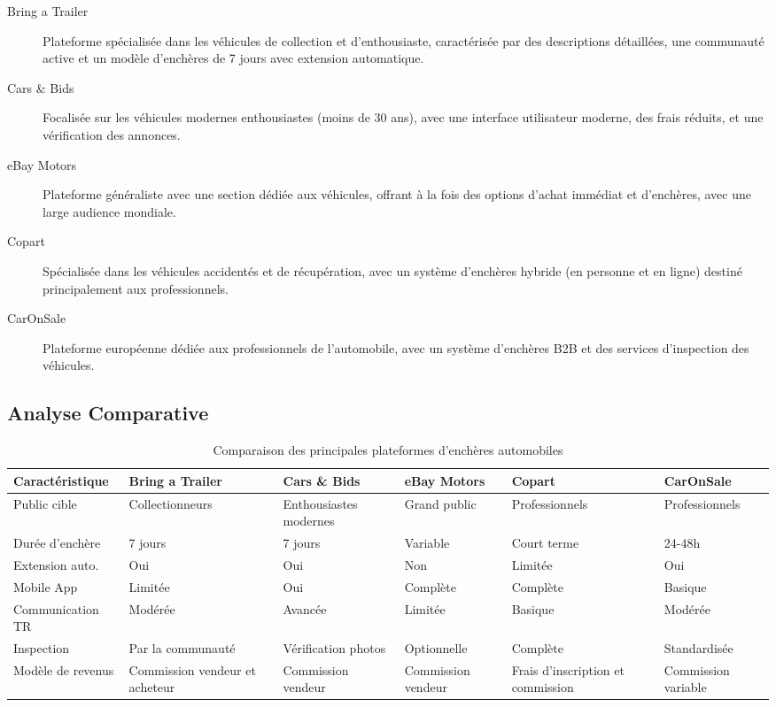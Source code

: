 \begin{description}
    \item[Bring a Trailer] Plateforme spécialisée dans les véhicules de collection et d'enthousiaste, caractérisée par des descriptions détaillées, une communauté active et un modèle d'enchères de 7 jours avec extension automatique.
    
    \item[Cars \& Bids] Focalisée sur les véhicules modernes enthousiastes (moins de 30 ans), avec une interface utilisateur moderne, des frais réduits, et une vérification des annonces.
    
    \item[eBay Motors] Plateforme généraliste avec une section dédiée aux véhicules, offrant à la fois des options d'achat immédiat et d'enchères, avec une large audience mondiale.

    \item[Copart] Spécialisée dans les véhicules accidentés et de récupération, avec un système d'enchères hybride (en personne et en ligne) destiné principalement aux professionnels.
    
    \item[CarOnSale] Plateforme européenne dédiée aux professionnels de l'automobile, avec un système d'enchères B2B et des services d'inspection des véhicules.
\end{description}

\subsection{Analyse Comparative}

\begin{table}[h]
\centering
\begin{tabular}{|p{2.5cm}|p{2cm}|p{2cm}|p{2cm}|p{2cm}|p{2cm}|}
\hline
\textbf{Caractéristique} & \textbf{Bring a Trailer} & \textbf{Cars \& Bids} & \textbf{eBay Motors} & \textbf{Copart} & \textbf{CarOnSale} \\
\hline
Public cible & Collectionneurs & Enthousiastes modernes & Grand public & Professionnels & Professionnels \\
\hline
Durée d'enchère & 7 jours & 7 jours & Variable & Court terme & 24-48h \\
\hline
Extension auto. & Oui & Oui & Non & Limitée & Oui \\
\hline
Mobile App & Limitée & Oui & Complète & Complète & Basique \\
\hline
Communication TR & Modérée & Avancée & Limitée & Basique & Modérée \\
\hline
Inspection & Par la communauté & Vérification photos & Optionnelle & Complète & Standardisée \\
\hline
Modèle de revenus & Commission vendeur et acheteur & Commission vendeur & Commission vendeur & Frais d'inscription et commission & Commission variable \\
\hline
\end{tabular}
\caption{Comparaison des principales plateformes d'enchères automobiles}
\label{table:platform-comparison}
\end{table}

